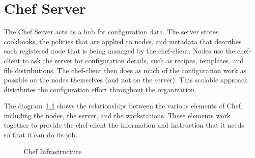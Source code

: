 \chapter{Chef Server}

The Chef Server acts as a hub for configuration data. The server stores cookbooks, the policies that are applied to nodes, and metadata that describes each registered node that is being managed by the chef-client. Nodes use the chef-client to ask the server for configuration details, such as recipes, templates, and file distributions. The chef-client then does as much of the configuration work as possible on the nodes themselves (and not on the server). This scalable approach distributes the configuration effort throughout the organization.

The diagram~\ref{fig:overview_chef_draft} shows the relationships between the various elements of Chef, including the nodes, the server, and the workstations. These elements work together to provide the chef-client the information and instruction that it needs so that it can do its job.

\begin{figure}[ht!]
  \caption{Chef Infrastructure}
  \label{fig:overview_chef_draft}
\end{figure}